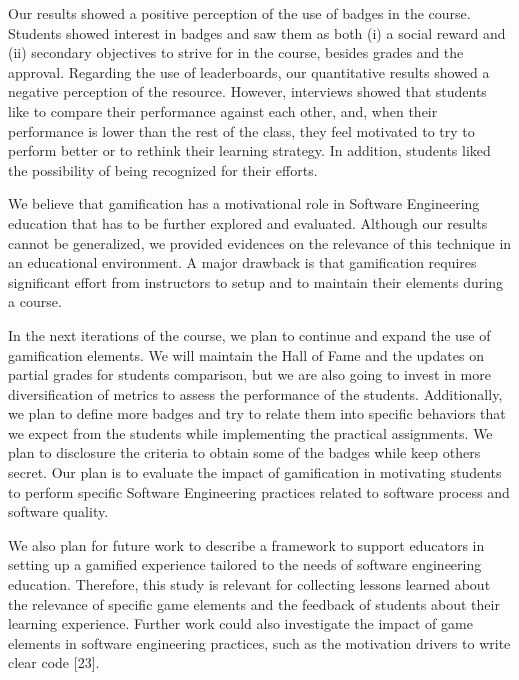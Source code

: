 Our results showed a positive perception of the use of badges in the course. Students showed interest in badges and saw them as both (i) a social reward and (ii) secondary objectives to strive for in the course, besides grades and the approval. Regarding the use of leaderboards, our quantitative results showed a negative perception of the resource. However, interviews showed that students like to compare their performance against each other, and, when their performance is lower than the rest of the class, they feel motivated to try to perform better or to rethink their learning strategy. In addition, students liked the possibility of being recognized for their efforts.

We believe that gamification has a motivational role in Software Engineering education that has to be further explored and evaluated. Although our results cannot be generalized, we provided evidences on the relevance of this technique in an educational environment. A major drawback is that gamification requires significant effort from instructors to setup and to maintain their elements during a course.

In the next iterations of the course, we plan to continue and expand the use of gamification elements. We will maintain the Hall of Fame and the updates on partial grades for students comparison, but we are also going to invest in more diversification of metrics to assess the performance of the students. Additionally, we plan to define more badges and try to relate them into specific behaviors that we expect from the students while implementing the practical assignments. We plan to disclosure the criteria to obtain some of the badges while keep others secret. Our plan is to evaluate the impact of gamification in motivating students to perform specific Software Engineering practices related to software process and software quality. 

We also plan for future work to describe a framework to support educators in setting up a gamified experience tailored to the needs of software engineering education. Therefore, this study is relevant for collecting lessons learned about the relevance of specific game elements and the feedback of students about their learning experience. Further work could also investigate the impact of game elements in software engineering practices, such as the motivation drivers to write clear code [23].

